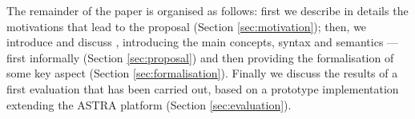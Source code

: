 The remainder of the paper is organised as follows:
%
first we describe in details the motivations that lead to the proposal (Section \ref{sec:motivation});
%
then, we introduce and discuss {\aser},  introducing the main
concepts, syntax and semantics --- first informally  (Section
\ref{sec:proposal}) and then providing the formalisation of some key
aspect (Section \ref{sec:formalisation}).
%
Finally we discuss the results of a first evaluation that has been
carried out, based on a prototype implementation extending the ASTRA
platform (Section \ref{sec:evaluation}).
%

